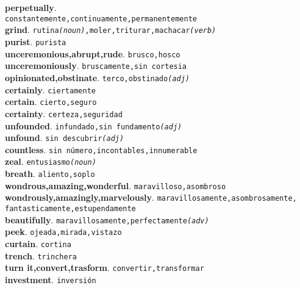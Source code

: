 \documentclass[twocolumn]{article}
\begin{document}
	\textsf{\textbf{perpetually}}.\\ \texttt{constantemente,continuamente,permanentemente}\\
	\textsf{\textbf{grind}}. \texttt{rutina{\scriptsize \textsl{(noun)}},moler,triturar,machacar{\scriptsize \textsl{(verb)}}}\\
	\textsf{\textbf{purist}}. \texttt{purista}\\
	\textsf{\textbf{unceremonious,abrupt,rude}}. \texttt{brusco,hosco}\\
	\textsf{\textbf{unceremoniously}}. \texttt{bruscamente,sin cortesia}\\
	\textsf{\textbf{opinionated,obstinate}}. \texttt{terco,obstinado{\scriptsize \textsl{(adj)}}}\\
	\textsf{\textbf{certainly}}. \texttt{ciertamente}\\
	\textsf{\textbf{certain}}. \texttt{cierto,seguro}\\
	\textsf{\textbf{certainty}}. \texttt{certeza,seguridad}\\
	\textsf{\textbf{unfounded}}. \texttt{infundado,sin fundamento{\scriptsize \textsl{(adj)}}}\\
	\textsf{\textbf{unfound}}. \texttt{sin descubrir{\scriptsize \textsl{(adj)}}}\\
	\textsf{\textbf{countless}}. \texttt{sin número,incontables,innumerable}\\
	\textsf{\textbf{zeal}}. \texttt{entusiasmo{\scriptsize \textsl{(noun)}}}\\
	\textsf{\textbf{breath}}. \texttt{aliento,soplo}\\
	\textsf{\textbf{wondrous,amazing,wonderful}}. \texttt{maravilloso,asombroso}\\
	\textsf{\textbf{wondrously,amazingly,marvelously}}. \texttt{maravillosamente,asombrosamente,\\fantasticamente,estupendamente}\\
	\textsf{\textbf{beautifully}}. \texttt{maravillosamente,perfectamente{\scriptsize \textsl{(adv)}}}\\
	\textsf{\textbf{peek}}. \texttt{ojeada,mirada,vistazo}\\
	\textsf{\textbf{curtain}}. \texttt{cortina}\\
	\textsf{\textbf{trench}}. \texttt{trinchera}\\
	\textsf{\textbf{turn it,convert,trasform}}. \texttt{convertir,transformar}\\
	\textsf{\textbf{investment}}. \texttt{inversi\'on}\\
\end{document}
